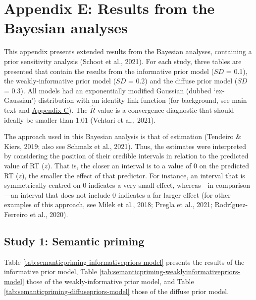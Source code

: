 \documentclass[
  12pt,
  man,floatsintext]{apa7}
\begin{document}
\clearpage

\renewcommand{\thefigure}{E\arabic{figure}} \setcounter{figure}{0}
\renewcommand{\thetable}{E\arabic{table}} \setcounter{table}{0}

\hypertarget{appendix-E-Bayesian-analysis-results}{%
\section{Appendix E: Results from the Bayesian analyses}\label{appendix-E-Bayesian-analysis-results}}

This appendix presents extended results from the Bayesian analyses, containing a prior sensitivity analysis (Schoot et al., 2021). For each study, three tables are presented that contain the results from the informative prior model (\(SD\) = 0.1), the weakly-informative prior model (\(SD\) = 0.2) and the diffuse prior model (\(SD\) = 0.3). All models had an exponentially modified Gaussian (dubbed `ex-Gaussian') distribution with an identity link function (for background, see main text and \protect\hyperlink{appendix-C-Bayesian-analysis-diagnostics}{\underline{Appendix C}}). The \(\widehat R\) value is a convergence diagnostic that should ideally be smaller than 1.01 (Vehtari et al., 2021).

The approach used in this Bayesian analysis is that of estimation (Tendeiro \& Kiers, 2019; also see Schmalz et al., 2021). Thus, the estimates were interpreted by considering the position of their credible intervals in relation to the predicted value of RT (\(z\)). That is, the closer an interval is to a value of 0 on the predicted RT (\(z\)), the smaller the effect of that predictor. For instance, an interval that is symmetrically centred on 0 indicates a very small effect, whereas---in comparison---an interval that does not include 0 indicates a far larger effect (for other examples of this approach, see Milek et al., 2018; Pregla et al., 2021; Rodríguez-Ferreiro et al., 2020).

\hypertarget{study-1-semantic-priming-4}{%
\subsection{Study 1: Semantic priming}\label{study-1-semantic-priming-4}}

Table \ref{tab:semanticpriming-informativepriors-model} presents the results of the informative prior model, Table \ref{tab:semanticpriming-weaklyinformativepriors-model} those of the weakly-informative prior model, and Table \ref{tab:semanticpriming-diffusepriors-model} those of the diffuse prior model.
\end{document}
